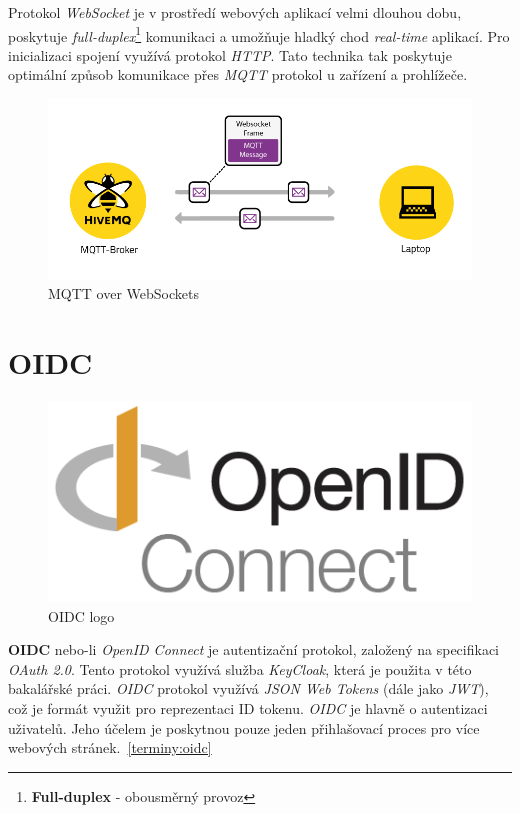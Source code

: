 Protokol \emph{WebSocket} je v prostředí webových aplikací velmi dlouhou dobu, poskytuje \emph{full-duplex}\footnote{\textbf{Full-duplex} - obousměrný provoz} komunikaci a umožňuje hladký chod \emph{real-time} aplikací.
Pro inicializaci spojení využívá protokol \emph{HTTP}.
Tato technika tak poskytuje optimální způsob komunikace přes \emph{MQTT} protokol u zařízení a prohlížeče.

\begin{figure}[ht]
  \centering
  \includegraphics[width=1 \linewidth]{obrazky-figures/mqtt_websocket.png}
  \caption{MQTT over WebSockets}
  \label{figure:mqtt_websockets}
\end{figure}

\newpage

\section{OIDC}
\label{app_prostredi:oidc}

\begin{figure}[hbt]
  \centering
  \includegraphics[width=.35 \linewidth]{obrazky-figures/OIDC.png}
  \caption{OIDC logo}
\end{figure}

\textbf{OIDC} nebo-li \emph{OpenID Connect} je autentizační protokol, založený na specifikaci \emph{OAuth 2.0}. Tento protokol využívá služba \emph{KeyCloak}, která je použita v této bakalářské práci.
\emph{OIDC} protokol využívá \emph{JSON Web Tokens} (dále jako \emph{JWT}), což je formát využit pro reprezentaci ID tokenu. \emph{OIDC} je hlavně o autentizaci uživatelů.
Jeho účelem je poskytnou pouze jeden přihlašovací proces pro více webových stránek.~\ref{terminy:oidc}

